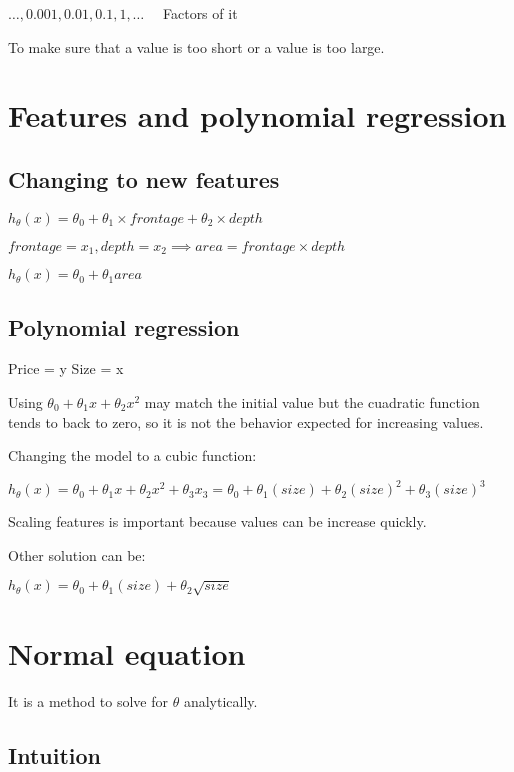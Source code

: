 \documentclass[a4paper]{report}
\begin{document}
          $\ldots, 0.001, 0.01, 0.1, 1, \ldots$ \ \ Factors of it

          To make sure that a value is too short or a value is too large.

    \section{Features and polynomial regression}

      \subsection{Changing to new features}

        $h_{\theta}(x) = \theta_{0} + \theta_{1} \times frontage + \theta_{2} \times depth$

        $frontage = x_{1}, depth = x_{2} \implies area = frontage \times depth$

        $h_{\theta}(x) = \theta_{0} + \theta_{1}area$

      \subsection{Polynomial regression}

        Price = y
        Size = x

        Using $\theta_{0} + \theta_{1}x + \theta_{2}x^{2}$ may match the initial value but the cuadratic function tends to back to zero, so it is not the behavior expected for increasing values.

        Changing the model to a cubic function:

        $h_{\theta}(x) = \theta_{0} + \theta_{1}x + \theta_{2}x^{2} + \theta_{3}x_{3} = \theta_{0} + \theta_{1}(size) + \theta_{2}(size)^{2} + \theta_{3}(size)^{3}$

        Scaling features is important because values can be increase quickly.

        Other solution can be:

        $h_{\theta}(x) = \theta_{0} + \theta_{1}(size) + \theta_{2}\sqrt{size}$

    \section{Normal equation}

      It is a method to solve for $\theta$ analytically.

      \subsection{Intuition}
      
\end{document}
